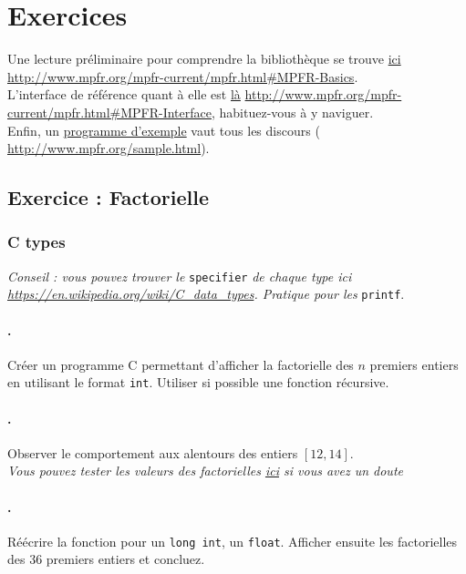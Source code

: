 \documentclass[a4paper,11pt]{exam}
\begin{document}
\section{Exercices}
Une lecture préliminaire pour comprendre la bibliothèque se trouve \href{http://www.mpfr.org/mpfr-current/mpfr.html#MPFR-Basics}{ici} \url{http://www.mpfr.org/mpfr-current/mpfr.html#MPFR-Basics}.\\
L'interface de référence quant à elle est \href{http://www.mpfr.org/mpfr-current/mpfr.html#MPFR-Interface}{là} \url{http://www.mpfr.org/mpfr-current/mpfr.html#MPFR-Interface}, habituez-vous à y naviguer.\\
Enfin, un \href{http://www.mpfr.org/sample.html}{programme d'exemple} vaut tous les discours ( \url{http://www.mpfr.org/sample.html}).

\setcounter{enumi}{1}
\subsection{Exercice \theenumi : Factorielle}
\subsubsection{C types}
\emph{Conseil : vous pouvez trouver le }\verb=specifier= \emph{de chaque type ici \url{https://en.wikipedia.org/wiki/C_data_types}. Pratique pour les} \verb=printf=.
\setcounter{enumii}{1}
\paragraph{\theenumii.} 
Créer un programme C permettant d'afficher la factorielle des $n$ premiers entiers en utilisant le format \verb=int=. Utiliser si possible une fonction récursive. 
\paragraph{\theenumii.} 
Observer le comportement aux alentours des entiers $[12, 14]$. \\
\emph{Vous pouvez tester les valeurs des factorielles \href{https://fr.numberempire.com/factorialcalculator.php}{ici} si vous avez un doute}
\paragraph{\theenumii.} 
Réécrire la fonction pour un \verb=long int=, un \verb=float=. Afficher ensuite les factorielles des 36 premiers entiers et concluez.
\end{document}
